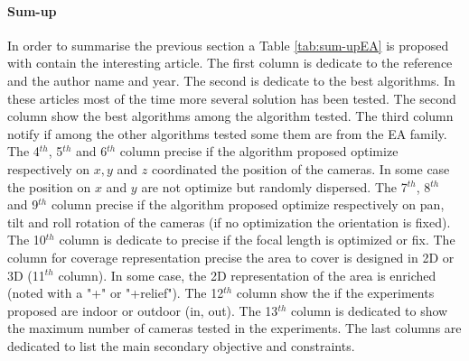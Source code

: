  \paragraph{Sum-up} 
 In order to summarise the previous section a Table \ref{tab:sum-upEA} is proposed with contain the interesting article.
 The first column  is dedicate to the reference and the author name  and year. The second is  dedicate to  the best algorithms. In these articles most of the time more several solution has been tested. The second column show the best algorithms among the algorithm tested. The third column notify if among the other algorithms tested some them are from the EA  family. The 4$^{th}$,  5$^{th}$ and 6$^{th}$ column precise if the algorithm proposed optimize respectively on $x,y$ and $z$ coordinated the position of the cameras. In some case the position on $x$ and $y$ are not optimize  but randomly dispersed. The 7$^{th}$,  8$^{th}$ and 9$^{th}$ column precise if the algorithm proposed optimize respectively on pan, tilt and roll rotation of the cameras (if no optimization the orientation is fixed). The 10$^{th}$ column is dedicate to precise if the focal length is optimized or fix. The column for coverage representation  precise the area to cover is designed in  2D or 3D (11$^{th}$ column). In some case, the 2D representation of the area is enriched (noted with a "+" or "+relief"). The 12$^{th}$  column show the if the experiments proposed are indoor or outdoor (in, out). The 13$^{th}$  column is dedicated to show the maximum number of cameras tested in the experiments.  
 The last columns are  dedicated to list the main secondary objective and constraints. 
  
 
 
